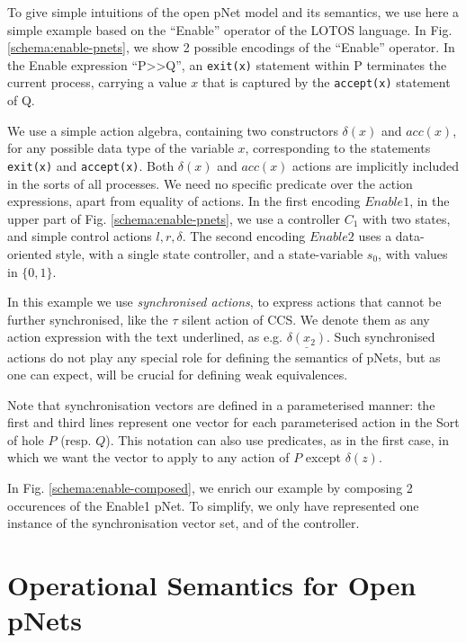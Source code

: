 \documentclass[smallcondensed]{svjour3}
\begin{document}
	To give simple intuitions of the open pNet model and its semantics, we use
	here a simple example based on the ``Enable'' operator of the LOTOS language.
	In Fig. \ref{schema:enable-pnets}, we show 2 possible encodings of the  
	``Enable'' operator.
	In the Enable expression ``P>>Q'', an \texttt{exit(x)} statement within P
	terminates the current process, carrying a value $x$ that
	is captured by the \texttt{accept(x)} statement of Q. 
	
	We use a simple action algebra,
	containing two constructors $\delta(x)$ and $acc(x)$, for any
	possible data type of the variable $x$, corresponding to the
	statements \texttt{exit(x)} and \texttt{accept(x)}. Both $\delta(x)$
	and $acc(x)$ actions are
	implicitly included in the sorts of all processes.
	We need no specific predicate over the action expressions, apart
	from equality of actions. 
	In the first encoding $Enable1$, in the upper part of
	Fig. \ref{schema:enable-pnets}, we use a controller $C_1$ with two
	states, and simple control actions $l, r, \delta$. The second encoding
	$Enable2$ uses a data-oriented style, with a single state controller, and a
	state-variable $s_0$, with values in $\{0,1\}$.

        In this example we use \emph{synchronised
          actions}, to express actions that cannot be further synchronised, like the
        $\tau$ silent action of CCS. We denote them as any action expression with the text
        underlined, as e.g. $\underline{\delta(x_2)}$. Such
        synchronised actions do not play any special role for defining
        the semantics of pNets, but as one can expect, will be crucial
        for defining weak equivalences.
	
	Note that synchronisation vectors are defined in a parameterised
	manner:  the first and third lines represent one vector
	for each parameterised action in the Sort of hole $P$
	(resp. $Q$). This notation can also use predicates, as in the first
	case, in which we want the vector to apply to any action of $P$
	except $\delta(z)$.
	
	In Fig. \ref{schema:enable-composed}, we enrich our example by
	composing 2 occurences of the Enable1 pNet. To simplify,
	we only have represented one instance of the synchronisation vector set,
	and of the controller.




\section{Operational Semantics for Open pNets}
\label{section:op-semantics}
\end{document}

